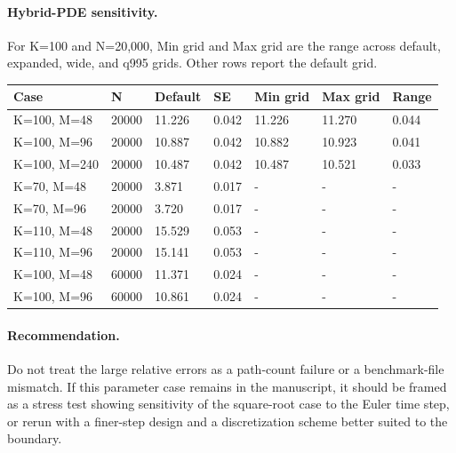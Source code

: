 \documentclass{article}
\begin{document}
\paragraph{Hybrid-PDE sensitivity.}
For K=100 and N=20,000, Min grid and Max grid are the range across default, expanded, wide, and q995 grids. Other rows report the default grid.

\begin{tabular}{lllllll}
\toprule
Case & N & Default & SE & Min grid & Max grid & Range \\
\midrule
K=100, M=48 & 20000 & 11.226 & 0.042 & 11.226 & 11.270 & 0.044 \\
K=100, M=96 & 20000 & 10.887 & 0.042 & 10.882 & 10.923 & 0.041 \\
K=100, M=240 & 20000 & 10.487 & 0.042 & 10.487 & 10.521 & 0.033 \\
K=70, M=48 & 20000 & 3.871 & 0.017 & - & - & - \\
K=70, M=96 & 20000 & 3.720 & 0.017 & - & - & - \\
K=110, M=48 & 20000 & 15.529 & 0.053 & - & - & - \\
K=110, M=96 & 20000 & 15.141 & 0.053 & - & - & - \\
K=100, M=48 & 60000 & 11.371 & 0.024 & - & - & - \\
K=100, M=96 & 60000 & 10.861 & 0.024 & - & - & - \\
\bottomrule
\end{tabular}

\paragraph{Recommendation.}
Do not treat the large relative errors as a path-count failure or a benchmark-file mismatch. If this parameter case remains in the manuscript, it should be framed as a stress test showing sensitivity of the square-root case to the Euler time step, or rerun with a finer-step design and a discretization scheme better suited to the boundary.
\end{document}
